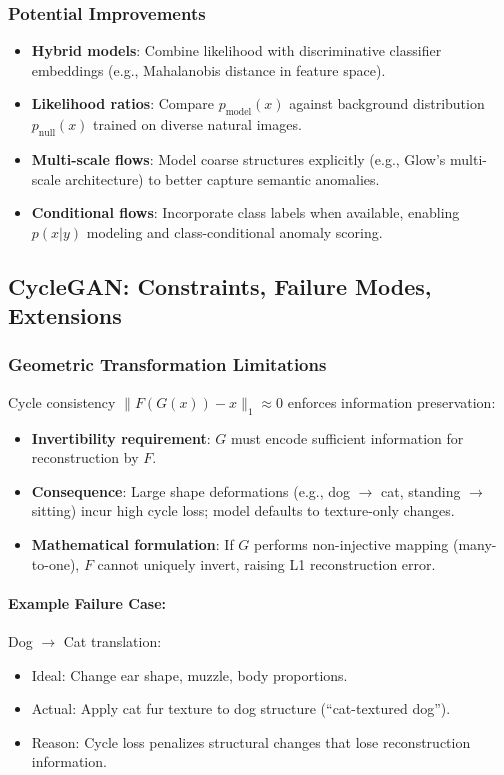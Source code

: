 \documentclass[11pt]{article}
\begin{document}
\subsubsection{Potential Improvements}
\begin{itemize}
\item \textbf{Hybrid models}: Combine likelihood with discriminative classifier embeddings (e.g., Mahalanobis distance in feature space).
\item \textbf{Likelihood ratios}: Compare $p_{\text{model}}(x)$ against background distribution $p_{\text{null}}(x)$ trained on diverse natural images.
\item \textbf{Multi-scale flows}: Model coarse structures explicitly (e.g., Glow's multi-scale architecture) to better capture semantic anomalies.
\item \textbf{Conditional flows}: Incorporate class labels when available, enabling $p(x|y)$ modeling and class-conditional anomaly scoring.
\end{itemize}

\subsection{CycleGAN: Constraints, Failure Modes, Extensions}
\subsubsection{Geometric Transformation Limitations}
Cycle consistency $\|F(G(x)) - x\|_1 \approx 0$ enforces information preservation:
\begin{itemize}
\item \textbf{Invertibility requirement}: $G$ must encode sufficient information for reconstruction by $F$.
\item \textbf{Consequence}: Large shape deformations (e.g., dog $\to$ cat, standing $\to$ sitting) incur high cycle loss; model defaults to texture-only changes.
\item \textbf{Mathematical formulation}: If $G$ performs non-injective mapping (many-to-one), $F$ cannot uniquely invert, raising L1 reconstruction error.
\end{itemize}

\paragraph{Example Failure Case:} Dog $\to$ Cat translation:
\begin{itemize}
\item Ideal: Change ear shape, muzzle, body proportions.
\item Actual: Apply cat fur texture to dog structure (``cat-textured dog'').
\item Reason: Cycle loss penalizes structural changes that lose reconstruction information.
\end{itemize}
\end{document}
